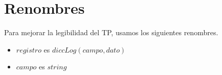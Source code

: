 \section{Renombres}

Para mejorar la legibilidad del TP, usamos los siguientes renombres.

\begin{itemize}
    \item $registro$ es $diccLog(campo,dato)$
    \item $campo$ es $string$
\end{itemize}

